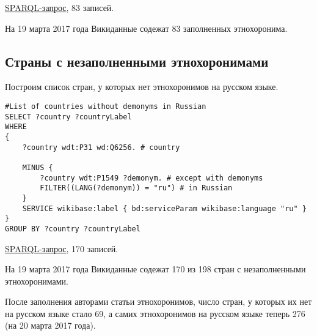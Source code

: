 \href{https://query.wikidata.org/#%23List%20of%20demonyms%20in%20Russian%0ASELECT%20%3Fcountry%20%3FcountryLabel%20%3Fdemonym%0AWHERE%0A%7B%0A%09%3Fcountry%20wdt%3AP31%20wd%3AQ6256.%20%20%20%20%20%20%23country%0A%09%3Fcountry%20wdt%3AP1549%20%3Fdemonym%20.%20%20%20%23demonym%0A%09FILTER%28%28LANG%28%3Fdemonym%29%29%20%3D%20%22ru%22%29%0A%09SERVICE%20wikibase%3Alabel%20%7B%20bd%3AserviceParam%20wikibase%3Alanguage%20%22ru%22%20%7D%0A%7D}{SPARQL-запрос}, 83 записей.

На 19 марта 2017 года Викиданные содежат 83 заполненных этнохоронима.

\subsection{Страны с незаполненными этнохоронимами}

Построим список стран, у которых нет этнохоронимов на русском языке.

\begin{lstlisting}[language=SPARQL label=countrywithoutdemonyms, caption=Список стран у которых нет этнохоронимов на русском языке]
#List of countries without demonyms in Russian
SELECT ?country ?countryLabel 
WHERE
{
    ?country wdt:P31 wd:Q6256. # country
    
    MINUS {
        ?country wdt:P1549 ?demonym. # except with demonyms
        FILTER((LANG(?demonym)) = "ru") # in Russian
    } 
    SERVICE wikibase:label { bd:serviceParam wikibase:language "ru" }
}
GROUP BY ?country ?countryLabel
\end{lstlisting}

\href{https://query.wikidata.org/#%23List%20of%20countries%20without%20demonyms%20in%20Russian%0ASELECT%20%3Fcountry%20%3FcountryLabel%20%0AWHERE%0A%7B%0A%09%3Fcountry%20wdt%3AP31%20wd%3AQ6256.%20%20%20%20%20%20%20%20%20%20%20%20%20%20%23%20country%0A%09MINUS%20%7B%20%3Fcountry%20wdt%3AP1549%20%3Fdemonym.%20%20%20%20%23%20except%20with%20demonyms%0A%20%20%20%20%20%20%20%20%20%20%20%20FILTER%28%28LANG%28%3Fdemonym%29%29%20%3D%20%22ru%22%29%20%23%20in%20Russian%0A%20%20%20%20%20%20%20%20%20%20%7D%20%20%20%20%0A%20%20%20%20%0A%09SERVICE%20wikibase%3Alabel%20%7B%20bd%3AserviceParam%20wikibase%3Alanguage%20%22ru%22%20%7D%0A%7D%0AGROUP%20BY%20%3Fcountry%20%3FcountryLabel}{SPARQL-запрос}, 170 записей. 

На 19 марта 2017 года Викиданные содежат 170 из 198 стран с незаполненными этнохоронимами.

После заполнения авторами статьи этнохоронимов, число стран, у которых их нет на русском языке стало 69, а самих этнохоронимов на русском языке теперь 276 (на 20 марта 2017 года).

